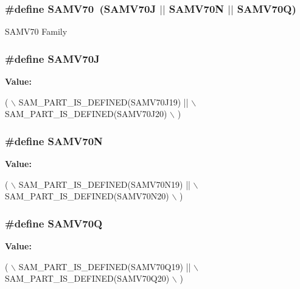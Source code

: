 \subsubsection[{S\+A\+M\+V70}]{\setlength{\rightskip}{0pt plus 5cm}\#define S\+A\+M\+V70~(S\+A\+M\+V70\+J $\vert$$\vert$ S\+A\+M\+V70\+N $\vert$$\vert$ S\+A\+M\+V70\+Q)}\label{group__sam__part__macros__group_gab470f27e045fe99f2b64bb30d5802282}
S\+A\+M\+V70 Family \hypertarget{group__sam__part__macros__group_gaa6cb4c3856c6856a57ec9f443d239527}{}
\subsubsection[{S\+A\+M\+V70\+J}]{\setlength{\rightskip}{0pt plus 5cm}\#define S\+A\+M\+V70\+J}\label{group__sam__part__macros__group_gaa6cb4c3856c6856a57ec9f443d239527}
{\bfseries Value\+:}
\begin{DoxyCode}
( \(\backslash\)
        SAM\_PART\_IS\_DEFINED(SAMV70J19) || \(\backslash\)
        SAM\_PART\_IS\_DEFINED(SAMV70J20) \(\backslash\)
    )
\end{DoxyCode}
\hypertarget{group__sam__part__macros__group_ga03d76f8d5034b894e50dabd497e64992}{}
\subsubsection[{S\+A\+M\+V70\+N}]{\setlength{\rightskip}{0pt plus 5cm}\#define S\+A\+M\+V70\+N}\label{group__sam__part__macros__group_ga03d76f8d5034b894e50dabd497e64992}
{\bfseries Value\+:}
\begin{DoxyCode}
( \(\backslash\)
        SAM\_PART\_IS\_DEFINED(SAMV70N19) || \(\backslash\)
        SAM\_PART\_IS\_DEFINED(SAMV70N20) \(\backslash\)
    )
\end{DoxyCode}
\hypertarget{group__sam__part__macros__group_ga70156b9e7c7f2ac6eaf8e04f73e01801}{}
\subsubsection[{S\+A\+M\+V70\+Q}]{\setlength{\rightskip}{0pt plus 5cm}\#define S\+A\+M\+V70\+Q}\label{group__sam__part__macros__group_ga70156b9e7c7f2ac6eaf8e04f73e01801}
{\bfseries Value\+:}
\begin{DoxyCode}
( \(\backslash\)
        SAM\_PART\_IS\_DEFINED(SAMV70Q19) || \(\backslash\)
        SAM\_PART\_IS\_DEFINED(SAMV70Q20) \(\backslash\)
    )
\end{DoxyCode}
\hypertarget{group__sam__part__macros__group_ga3244695e750cd101d85bdfbc8802c5e9}{}
